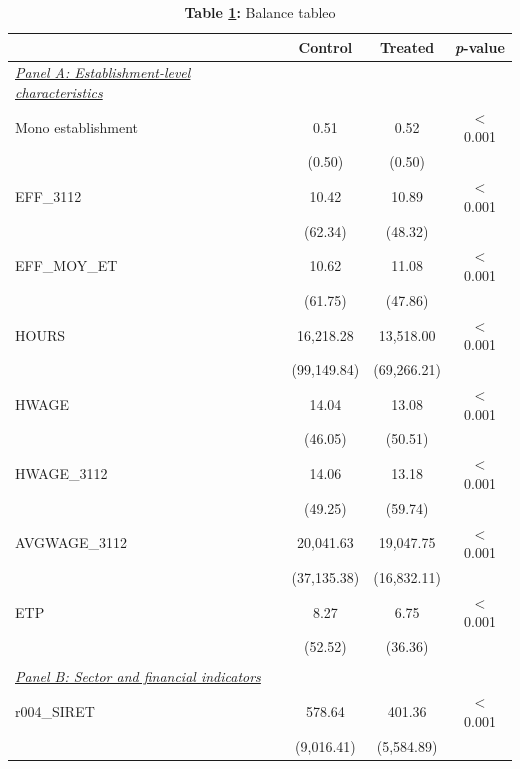 \begin{table}[htbp]
\centering
\begin{threeparttable}
\caption{\textbf{Table \ref{tab:balance_table}:} Balance tableo}
\label{tab:balance_table}
\begin{tabular}{lccc}
\toprule
& Control & Treated & \textit{p}-value \\
\midrule
\textit{\underline{Panel A: Establishment-level characteristics}} & & & \\
Mono establishment          & 0.51           & 0.52           & $<$0.001 \\
                            & (0.50)         & (0.50)         & \\
EFF\_3112                   & 10.42          & 10.89          & $<$0.001 \\
                            & (62.34)        & (48.32)        & \\
EFF\_MOY\_ET                & 10.62          & 11.08          & $<$0.001 \\
                            & (61.75)        & (47.86)        & \\
HOURS                      & 16,218.28      & 13,518.00      & $<$0.001 \\
                            & (99,149.84)    & (69,266.21)    & \\
HWAGE                      & 14.04          & 13.08          & $<$0.001 \\
                            & (46.05)        & (50.51)        & \\
HWAGE\_3112                & 14.06          & 13.18          & $<$0.001 \\
                            & (49.25)        & (59.74)        & \\
AVGWAGE\_3112              & 20,041.63      & 19,047.75      & $<$0.001 \\
                            & (37,135.38)    & (16,832.11)    & \\
ETP                        & 8.27           & 6.75           & $<$0.001 \\
                            & (52.52)        & (36.36)        & \\
\\
\textit{\underline{Panel B: Sector and financial indicators}} & & & \\
r004\_SIRET                & 578.64         & 401.36         & $<$0.001 \\
                            & (9,016.41)     & (5,584.89)     & \\

\end{tabular}
\end{threeparttable}
\end{table}
